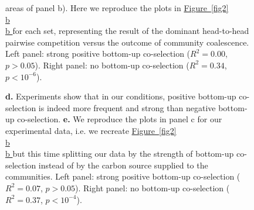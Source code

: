 \documentclass[a4paper,10pt]{article}
\newcommand{\figref}[2][]{%
  \hyperref[{#2}]{%
    Figure~\ref*{#2}%
    \ifx\\#1\\%
    \else
      #1%
    \fi
  }%
}
\begin{document}
\begin{figure}[!h]
{areas of panel b). Here we reproduce the plots in \figref[b]{fig2} for each set, representing the
result of the dominant head-to-head pairwise competition versus the outcome of community coalescence.
Left panel: strong positive bottom-up co-selection
($R^2=0.00$, $p>0.05$).
Right panel: no bottom-up co-selection
($R^2=0.34$, $p<10^{-6}$).

\textbf{d.} Experiments show that in our conditions, positive bottom-up co-selection is indeed more
frequent and strong than negative bottom-up co-selection.
\textbf{e.} We reproduce the plots in panel c for our experimental data,
i.e. we recreate
\figref[b]{fig2} but this time splitting our data by the strength of bottom-up co-selection
instead of by the carbon source supplied to the communities.
Left panel: strong positive bottom-up co-selection
($R^2=0.07$, $p>0.05$).
Right panel: no bottom-up co-selection
($R^2=0.37$, $p<10^{-4}$).}
\label{fig3}
\end{figure}

\clearpage
\end{document}
